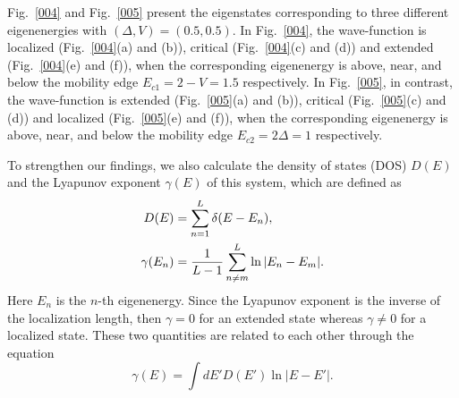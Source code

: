\documentclass[prb,showpacs,twocolumn,aps,superscriptaddress,a4paper]{revtex4-1}
\begin{document}
Fig.~\ref{004} and Fig.~\ref{005} present the eigenstates corresponding to three different eigenenergies with $(\Delta,V)= (0.5,0.5)$. In Fig.~\ref{004}, the wave-function is localized (Fig.~\ref{004}(a) and (b)), critical (Fig.~\ref{004}(c) and (d)) and extended (Fig.~\ref{004}(e) and (f)), when the corresponding eigenenergy is above, near, and below the mobility edge $E_{c1}=2- V=1.5$ respectively. In Fig.~\ref{005}, in contrast, the wave-function is extended (Fig.~\ref{005}(a) and (b)), critical (Fig.~\ref{005}(c) and (d)) and localized (Fig.~\ref{005}(e) and (f)), when the corresponding eigenenergy is above, near, and below the mobility edge $E_{c2}=2\Delta=1$ respectively.


To strengthen our findings, we also calculate the density of states (DOS) $D(E)$ and the Lyapunov exponent $\gamma(E)$ of this system, which are defined as~\cite{sarma18}
\begin{align}
D(E) &=\sum_{n=1}^{L} \delta(E-E_n),\notag\\
\gamma(E_n) &=\frac{1}{L-1}\sum_{n\neq m}^{L}\ln| E_n-E_m|.
\end{align}
Here $E_n$ is the $n$-th eigenenergy. Since the Lyapunov exponent is the inverse of the localization length, then $\gamma=0$ for an extended state whereas $\gamma \neq0$ for a localized state. These two quantities are related to each other through the equation
\begin{equation}
\gamma(E) =\int dE'D(E') \ln|E- E'|.
\end{equation}
\end{document}
